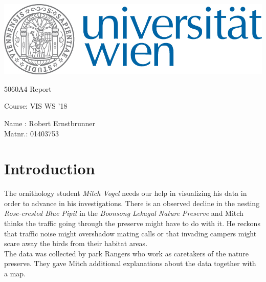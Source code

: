 \documentclass{article}
\makeatletter
\newcommand\HUGE{\@setfontsize\Huge{50}{60}}
\makeatother
\begin{document}

 
\thispagestyle{empty}
\begin{center}
\begin{minipage}{.9\linewidth}
\flushright
	      		 
\includegraphics[width=0.5\linewidth]{univie.jpg}\par
\vspace{1.5cm}
\centering 	
	{\scshape{\HUGE A4 Report \par}}
	\vspace{1cm}
    {\scshape{\Large Course: VIS WS '18 \par}}
	\vspace{1cm}

 {\Large Name : Robert Ernstbrunner \\ Matnr.: 01403753 \hspace{2.2cm} \ \par}
 	\vspace{.7cm}

 

\end{minipage}
\end{center}
\clearpage
\section{Introduction}

The ornithology student \textit{Mitch Vogel} needs our help in visualizing his data in order to advance in his investigations. There is an observed decline in the nesting \textit{Rose-crested Blue Pipit} in the \textit{Boonsong Lekagul Nature Preserve} and Mitch thinks the traffic going through the preserve might have to do with it.
He reckons that traffic noise might overshadow mating calls or that invading campers might scare away the birds from their habitat areas. \\
The data was collected by park Rangers who work as caretakers of the nature preserve. They gave Mitch additional explanations about the data together with a map. 
\end{document}
